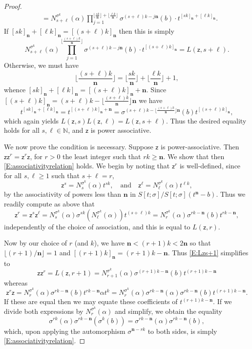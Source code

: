 \documentclass[10pt,a4paper]{amsart}
\newcommand{\Sone}[1]{\Stsigma/\Stsigma (t^{\de}-#1)} %
\newcommand{\Stsigma}{S[t;\sigma]}
\newcommand{\de}{\mathbf{n}}  %
\newcommand{\scz}{\mathsf{z}}  %
\begin{document}
\begin{proof}
\begin{align*}
&= N_{s+\ell}^{\sigma^k}(\alpha)\prod_{j=1}^{\lfloor \frac{s k}{\de}\rfloor+\lfloor \frac{\ell k}{\de}\rfloor} \sigma^{(s+\ell)k-j\de }(b)  \cdot t^{[s k]_{\de} + [\ell k]_{\de}}.
\end{align*}
If $[sk]_{\de}+[\ell k]_{\de} = [(s+\ell)k]_{\de}$ then this is simply
$$
N_{s+\ell}^{\sigma^k}(\alpha)\prod_{j=1}^{\lfloor \frac{(s+\ell)k}{\de}\rfloor } \sigma^{(s+\ell)k-j\de}(b)  \cdot t^{[(s+\ell) k]_{\de}} = L(\scz,s+\ell).
$$
Otherwise, we must have
$$
\lfloor \frac{(s+\ell)k}{\de}\rfloor  = \lfloor \frac{s k}{\de}\rfloor+\lfloor \frac{\ell k}{\de}\rfloor+1,
$$
whence $
[sk]_{\de}+[\ell k]_{\de} = [(s+\ell)k]_{\de} + \de.
$
Since $[(s+\ell) k]_{\de}=(s+\ell)k-\lfloor \frac{(s+\ell)k}{\de}\rfloor \de$ we have
$$
t^{[s k]_{\de} + [\ell k]_{\de}}=t^{[(s+\ell) k]_{\de}+\de}= \sigma^{(s+\ell)k-\lfloor \frac{(s+\ell)k}{\de}\rfloor \de}(b)t^{[(s+\ell) k]_{\de}},
$$
which again yields $L(\scz,s)L(\scz,\ell)=L(\scz,s+\ell).$  Thus the desired equality holds for all $s,\ell \in \mathbb{N}$, and $\scz$ is power associative.

We now prove the condition is necessary.  Suppose $\scz$ is power-associative.  Then  $\scz\scz^r=\scz^r\scz$, for $r>0$ the least integer such that $rk\geq \de$.  We show that then  \eqref{E:associativityrelation} holds.  We begin by noting that $\scz^r$ is well-defined, since for all $s,\ell\geq 1$ such that $s+\ell=r$,
$$
\scz^s=N_s^{\sigma^k}(\alpha)t^{sk}, \quad \text{and} \quad \scz^\ell = N_\ell^{\sigma^k}(\alpha)t^{\ell k},
$$
by the associativity of powers less than $\de$ in $\Sone{b}$.  Thus we readily compute as above that
$$
\scz^r=\scz^s\scz^\ell= N_s^{\sigma^k}(\alpha)\sigma^{sk}(N_\ell^{\sigma^k}(\alpha))t^{(s+\ell)k}=N_r^{\sigma^k}(\alpha)\sigma^{rk-\de}(b)t^{rk-\de},
$$
independently of the choice of association, and this is equal to $L(\scz,r)$.

Now by our choice of $r$ (and $k$), we have $\de<(r+1)k < 2\de$ so that $\lfloor (r+1)/\de \rfloor=1$ and $[(r+1)k]_{\de}=(r+1)k-\de$.  Thus \eqref{E:Lzs+1} simplifies to
$$
\scz \scz^r=L(\scz,r+1)=N_{r+1}^{\sigma^k}(\alpha)\sigma^{(r+1)k-\de}(b)t^{(r+1)k-\de}
$$
whereas
$$  \scz^r \scz=N_r^{\sigma^k}(\alpha) \sigma^{rk-\de}(b)t^{rk-\de} \alpha t^k
= N_r^{\sigma^k}(\alpha) \sigma^{rk-\de}(\alpha)\sigma^{rk-\de}(b)t^{(r+1)k-\de}.
$$
If these are equal then we may equate these coefficients of $t^{(r+1)k-\de}$. If we divide both expressions by $N_r^{\sigma^k}(\alpha)$ and simplify, we obtain the equality
$$
\sigma^{rk}(\alpha)\sigma^{rk-\de}(\sigma^k(b))=\sigma^{rk-\de}(\alpha)\sigma^{rk-\de}(b),
$$
which, upon applying the automorphism $\sigma^{\de-rk}$ to both sides, is simply \eqref{E:associativityrelation}.
\end{proof}
\end{document}
